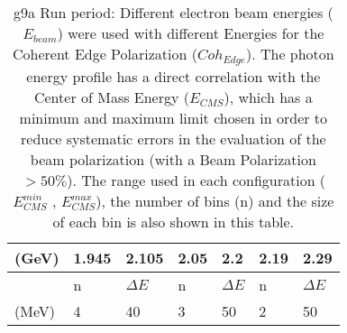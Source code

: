 \begin{table}[h]
\begin{center}
\begin{tabular}{ |l||l|l||l|l||l|l||l|l||}
      \multicolumn{3}{|l||}{(GeV)} & 1.945 & 2.105 & 2.05 & 2.2 & 2.19 & 2.29 \\
      \hline
      \multicolumn{3}{|l||}{} & n  &  $\Delta E$ & n  &  $\Delta E$ & n  &  $\Delta E$ \\
      \multicolumn{3}{|l||}{(MeV)} & 4 & 40 & 3 & 50 & 2 & 50  \\
      \hline
    \end{tabular}
  \end{center}
  \caption{g9a Run period: Different electron beam energies ($E_{beam}$) were used with different Energies for the Coherent Edge Polarization ($Coh_{Edge}$). The photon energy profile has a direct correlation with the Center of Mass Energy ($E_{CMS}$), which has a minimum and maximum limit chosen in order to reduce systematic errors in the evaluation of the beam polarization (with a Beam Polarization $>50\%$). The range used in each configuration ($E_{CMS}^{min} $ ,  $E_{CMS}^{max}$), the number of bins (n) and the size of each bin is also shown in this table.}
  \label{table:g9a_conf_color}
\end{table}

